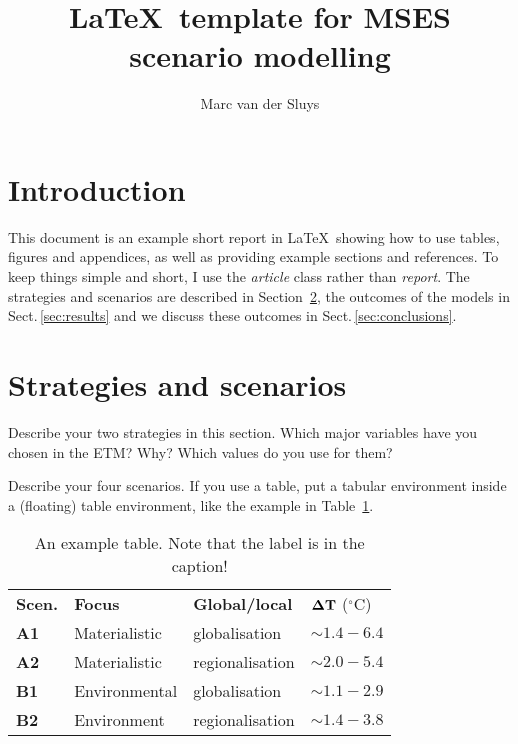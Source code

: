 \documentclass[11pt]{article}
\title{\LaTeX\ template for MSES scenario modelling}
\author{Marc van der Sluys}
\begin{document}
\maketitle

\tableofcontents


\section{Introduction}
\label{sec:intro}

This document is an example short report in \LaTeX\ showing how to use tables, figures and appendices, as well
as providing example sections and references.  To keep things simple and short, I use the \emph{article} class
rather than \emph{report}.  The strategies and scenarios are described in Section~\ref{sec:scenarios}, the
outcomes of the models in Sect.\,\ref{sec:results} and we discuss these outcomes in
Sect.\,\ref{sec:conclusions}.


\section{Strategies and scenarios}
\label{sec:scenarios}

Describe your two strategies in this section.  Which major variables have you chosen in the
ETM?  Why?  Which values do you use for them?

Describe your four scenarios.  If you use a table, put a tabular environment inside a (floating) table
environment, like the example in Table~\ref{tab:example}.

\begin{table}
  \centering
  \begin{tabular}{llll}
    \textbf{Scen.} & \textbf{Focus} & \textbf{Global/local} & $\bf \Delta T$ ($^\circ$C) \\
    \textbf{A1}    &  Materialistic & globalisation         & $\sim 1.4 - 6.4$ \\
    \textbf{A2}    &  Materialistic & regionalisation       & $\sim 2.0 - 5.4$ \\
    \textbf{B1}    &  Environmental & globalisation         & $\sim 1.1 - 2.9$ \\
    \textbf{B2}    &  Environment   & regionalisation       & $\sim 1.4 - 3.8$ \\
  \end{tabular}
  \caption{An example table.  Note that the label is in the caption!
    \label{tab:example}
  }
\end{table}
\end{document}
